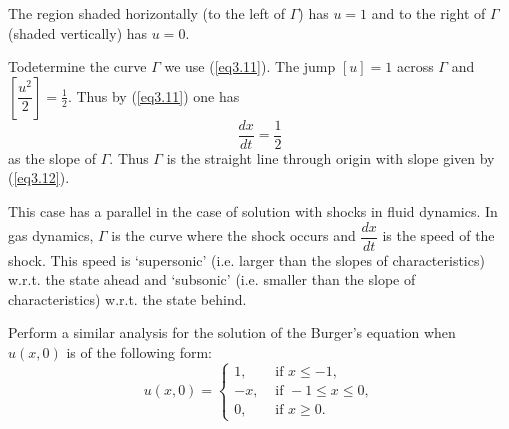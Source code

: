\begin{exam}
The region shaded horizontally (to the left of $\Gamma$) has $u=1$ and
to the right of $\Gamma$ (shaded vertically) has $u=0$. 

To\pageoriginale determine the curve $\Gamma$ we use (\ref{eq3.11}). The jump
$[u] =1$ across $\Gamma$ and $\left[\dfrac{u^2}{2}\right] =
\frac{1}{2}$. Thus by (\ref{eq3.11}) one has
\begin{equation*}
\frac{dx}{dt} = \frac{1}{2}
\tag{3.12}\label{eq3.12}
\end{equation*}
as the slope of $\Gamma$. Thus $\Gamma$ is the straight line through
origin with slope given by (\ref{eq3.12}). 
\end{exam}

\begin{remark}\label{chap3:rem3.1}
This case has a parallel in the case of solution with shocks in fluid
dynamics. In gas dynamics, $\Gamma$ is the curve where the shock
occurs and $\dfrac{dx}{dt}$ is the speed of the shock. This speed is
`supersonic' (i.e. larger than the slopes of characteristics)
w.r.t. the state ahead and `subsonic' (i.e. smaller than the slope of
characteristics) w.r.t. the state behind. 
\end{remark}

\begin{exercise}\label{chap3:exer3.1}
Perform a similar analysis for the solution of the Burger's equation
when $u(x,0)$ is of the following form:
\begin{equation*}
u(x,0) = 
\begin{cases}
 1, & \text{ if } x \leq -1, \\
-x, & \text{ if } -1 \leq x \leq 0,\\
0, & \text{ if } x \geq 0.
\end{cases}
\end{equation*}
\end{exercise}

